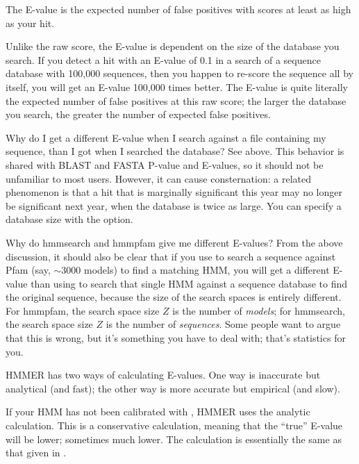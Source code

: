 The E-value is the expected number of false positives with scores at
least as high as your hit.

Unlike the raw score, the E-value is dependent on the size of the
database you search. If you detect a hit with an E-value of 0.1 in a
search of a sequence database with 100,000 sequences, then you happen
to re-score the sequence all by itself, you will get an E-value
100,000 times better. The E-value is quite literally the expected
number of false positives at this raw score; the larger the database
you search, the greater the number of expected false positives.

\begin{srefaq}{Why do I get a different E-value when I search
against a file containing my sequence, than I got when I searched the
database?} See above. This behavior is shared with BLAST and FASTA
P-value and E-values, so it should not be unfamiliar to most users.
However, it can cause consternation: a related phenomenon is that a
hit that is marginally significant this year may no longer be
significant next year, when the database is twice as large. You can
specify a database size with the  option.
\end{srefaq}

\begin{srefaq}{Why do hmmsearch and hmmpfam give me different
E-values?} From the above discussion, it should also be clear that if
you use  to search a sequence against Pfam (say, $\sim
3000$ models) to find a matching HMM, you will get a different E-value
than using  to search that single HMM against a
sequence database to find the original sequence, because the size of
the search spaces is entirely different. For hmmpfam, the search space
size $Z$ is the number of \emph{models}; for hmmsearch, the search
space size $Z$ is the number of \emph{sequences}. Some people want to
argue that this is wrong, but it's something you have to deal with;
that's statistics for you.
\end{srefaq}

HMMER has two ways of calculating E-values. One way is inaccurate but
analytical (and fast); the other way is more accurate but empirical
(and slow).

If your HMM has not been calibrated with , HMMER
uses the analytic calculation. This is a conservative calculation,
meaning that the ``true'' E-value will be lower; sometimes much lower.
The calculation is essentially the same as that given in
\cite{Barrett97}.

